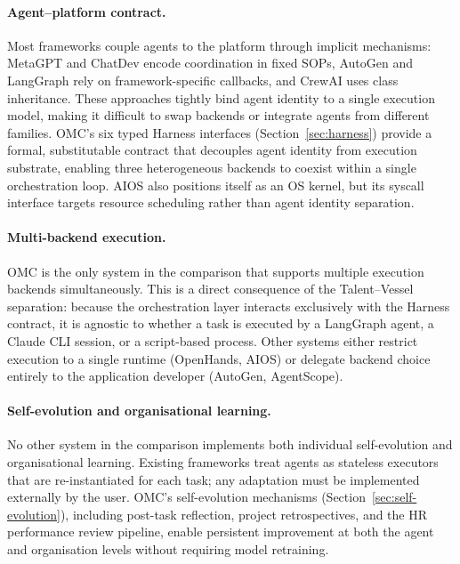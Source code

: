 \documentclass[11pt,a4paper]{article}
\begin{document}
\paragraph{Agent--platform contract.}
Most frameworks couple agents to the platform through implicit mechanisms: MetaGPT and ChatDev encode coordination in fixed SOPs, AutoGen and LangGraph rely on framework-specific callbacks, and CrewAI uses class inheritance.  These approaches tightly bind agent identity to a single execution model, making it difficult to swap backends or integrate agents from different families.  OMC's six typed Harness interfaces (Section~\ref{sec:harness}) provide a formal, substitutable contract that decouples agent identity from execution substrate, enabling three heterogeneous backends to coexist within a single orchestration loop.  AIOS also positions itself as an OS kernel, but its syscall interface targets resource scheduling rather than agent identity separation.

\paragraph{Multi-backend execution.}
OMC is the only system in the comparison that supports multiple execution backends simultaneously.  This is a direct consequence of the Talent--Vessel separation: because the orchestration layer interacts exclusively with the Harness contract, it is agnostic to whether a task is executed by a LangGraph agent, a Claude CLI session, or a script-based process.  Other systems either restrict execution to a single runtime (OpenHands, AIOS) or delegate backend choice entirely to the application developer (AutoGen, AgentScope).

\paragraph{Self-evolution and organisational learning.}
No other system in the comparison implements both individual self-evolution and organisational learning.  Existing frameworks treat agents as stateless executors that are re-instantiated for each task; any adaptation must be implemented externally by the user.  OMC's self-evolution mechanisms (Section~\ref{sec:self-evolution}), including post-task reflection, project retrospectives, and the HR performance review pipeline, enable persistent improvement at both the agent and organisation levels without requiring model retraining.


\end{document}

